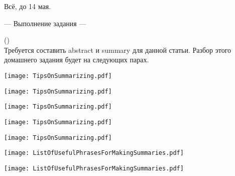 \documentclass[main.tex]{subfiles}
\begin{document}
Всё, до 14 мая.

\newpage
{}

\hypertarget{ltask:2024-04-24-2}{--- Выполнение задания ---} (\hyperref[task:2024-04-24-2]{\color{blue}{перейти к тексту задания}})
\\

Требуется составить abstract и summary для данной статьи.
Разбор этого домашнего задания будет на следующих парах.


\newpage
{}
\label{subsec:tips-on-summarizing}

{\parindent25pt\texttt{[image: TipsOnSummarizing.pdf]}}\newpage

{\parindent25pt\texttt{[image: TipsOnSummarizing.pdf]}}\newpage

{\parindent25pt\texttt{[image: TipsOnSummarizing.pdf]}}\newpage

{\parindent25pt\texttt{[image: TipsOnSummarizing.pdf]}}\newpage

{\parindent25pt\texttt{[image: TipsOnSummarizing.pdf]}}


\newpage
{}
\label{subsec:list-of-useful-phrases-for-making-summaries}

{\parindent25pt\texttt{[image: ListOfUsefulPhrasesForMakingSummaries.pdf]}}\newpage

{\parindent25pt\texttt{[image: ListOfUsefulPhrasesForMakingSummaries.pdf]}}
\end{document}
